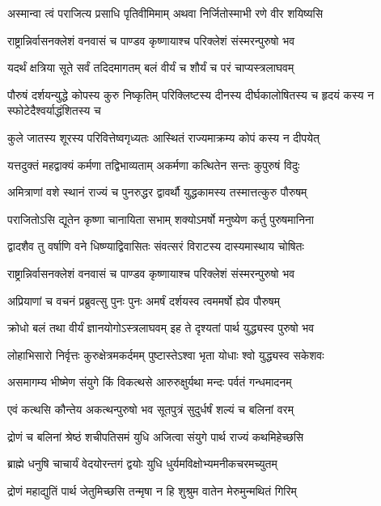 \twolineshloka
{अस्मान्वा त्वं पराजित्य प्रसाधि पृतिवीमिमाम्}
{अथवा निर्जितोस्माभी रणे वीर शयिष्यसि}


\twolineshloka
{राष्ट्रान्निर्वासनक्लेशं वनवासं च पाण्डव}
{कृष्णायाश्च परिक्लेशं संस्मरन्पुरुषो भव}


\twolineshloka
{यदर्थं क्षत्रिया सूते सर्वं तदिदमागतम्}
{बलं वीर्यं च शौर्यं च परं चाप्यस्त्रलाघवम्}


\threelineshloka
{पौरुषं दर्शयन्युद्धे कोपस्य कुरु निष्कृतिम्}
{परिक्लिष्टस्य दीनस्य दीर्घकालोषितस्य च}
{हृदयं कस्य न स्फोटेदैश्वर्याद्धंशितस्य च}


\twolineshloka
{कुले जातस्य शूरस्य परिवित्तेष्वगृध्यतः}
{आस्थितं राज्यमाक्रम्य कोपं कस्य न दीपयेत्}


\twolineshloka
{यत्तदुक्तं महद्वाक्यं कर्मणा तद्विभाव्यताम्}
{अकर्मणा कत्थितेन सन्तः कुपुरुषं विदुः}


\twolineshloka
{अमित्राणां वशे स्थानं राज्यं च पुनरुद्धर}
{द्वावर्थौ युद्धकामस्य तस्मात्तत्कुरु पौरुषम्}


\twolineshloka
{पराजितोऽसि द्यूतेन कृष्णा चानायिता सभाम्}
{शक्योऽमर्षो मनुष्येण कर्तु पुरुषमानिना}


\twolineshloka
{द्वादशैव तु वर्षाणि वने धिष्ण्याद्विवासितः}
{संवत्सरं विराटस्य दास्यमास्थाय चोषितः}


\twolineshloka
{राष्ट्रान्निर्वासनक्लेशं वनवासं च पाण्डव}
{कृष्णायाश्च परिक्लेशं संस्मरन्पुरुषो भव}


\twolineshloka
{अप्रियाणां च वचनं प्रब्रुवत्सु पुनः पुनः}
{अमर्षं दर्शयस्व त्वममर्षो ह्येव पौरुषम्}


\twolineshloka
{क्रोधो बलं तथा वीर्यं ज्ञानयोगोऽस्त्रलाघवम्}
{इह ते दृश्यतां पार्थ युद्ध्यस्व पुरुषो भव}


\twolineshloka
{लोहाभिसारो निर्वृत्तः कुरुक्षेत्रमकर्दमम्}
{पुष्टास्तेऽश्वा भृता योधाः श्वो युद्ध्यस्व सकेशवः}


\twolineshloka
{असमागम्य भीष्मेण संयुगे किं विकत्थसे}
{आरुरुक्षुर्यथा मन्दः पर्वतं गन्धमादनम्}


\twolineshloka
{एवं कत्थसि कौन्तेय अकत्थन्पुरुषो भव}
{सूतपुत्रं सुदुर्धर्षं शल्यं च बलिनां वरम्}


\twolineshloka
{द्रोणं च बलिनां श्रेष्ठं शचीपतिसमं युधि}
{अजित्वा संयुगे पार्थ राज्यं कथमिहेच्छसि}


\twolineshloka
{ब्राह्मे धनुषि चाचार्यं वेदयोरन्तगं द्वयोः}
{युधि धुर्यमविक्षोभ्यमनीकचरमच्युतम्}


\twolineshloka
{द्रोणं महाद्युतिं पार्थ जेतुमिच्छसि तन्मृषा}
{न हि शुश्रुम वातेन मेरुमुन्मथितं गिरिम्}


